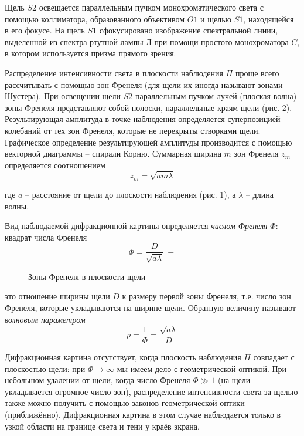 \documentclass[14pt]{article}
\begin{document}
Щель $S2$ освещается параллельным пучком монохроматического света с помощью коллиматора, образованного объективом $O1$ и щелью $S1$, находящейся в его фокусе. На щель $S1$ сфокусировано изображение спектральной линии, выделенной из спектра ртутной лампы $Л$ при помощи простого монохроматора $C$, в котором используется призма прямого зрения. 

Распределение интенсивности света в плоскости наблюдения $\Pi$ проще всего рассчитывать с помощью зон Френеля (для щели их иногда называют зонами Шустера). При освещении щели $S2$ параллельным пучком лучей (плоская волна) зоны Френеля представляют собой полоски, параллельные краям щели (рис. 2). Результирующая амплитуда в точке наблюдения определяется суперпозицией колебаний от тех зон Френеля, которые не перекрыты створками щели. Графическое определение результирующей амплитуды производится с помощью векторной диаграммы -- спирали Корню. Суммарная ширина $m$ зон Френеля $z_m$ определяется соотношением
$$
	z_m = \sqrt{am\lambda}
$$

где
$a$ -- расстояние от щели до плоскости наблюдения (рис. 1), а $\lambda$ -- длина волны.

Вид наблюдаемой дифракционной картины определяется \textsl{числом Френеля} $\Phi$: квадрат числа Френеля
$$
	\Phi = \frac{D}{\sqrt{a\lambda}} ~-
$$

\begin{figure}[h!]
	\caption{Зоны Френеля в плоскости щели}
	\label{fig:image}
\end{figure}

это отношение ширины щели $D$ к размеру первой зоны Френеля, т.е. число зон Френеля, которые укладываются на ширине щели. Обратную величину называют \textsl{волновым параметром}
$$
	p = \frac{1}{\Phi} = \frac{\sqrt{a\lambda}}{D}
$$

Дифракционная картина отсутствует, когда плоскость наблюдения $\Pi$ совпадает с плоскостью щели: при $\Phi \rightarrow \infty$ мы имеем дело с геометрической оптикой. При небольшом удалении от щели, когда число Френеля $\Phi \gg 1$ (на щели укладывается огромное число зон), распределение интенсивности света за щелью также можно получить с помощью законов геометрической оптики (приближённо). Дифракционная картина в этом случае наблюдается только в узкой области на границе света и тени у краёв экрана.
\end{document}
